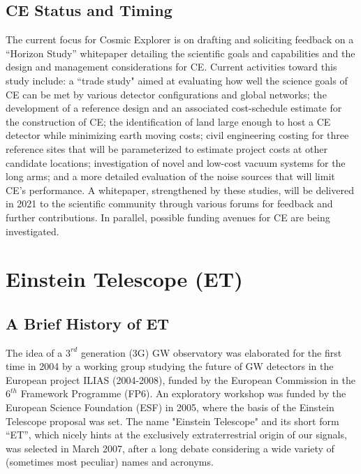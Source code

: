 \documentclass[graybox, nosecnum]{svmult}
\begin{document}
\subsection{CE Status and Timing}

The current focus for Cosmic Explorer is on drafting and soliciting feedback on a ``Horizon Study'' whitepaper detailing the scientific goals and capabilities and the design and management considerations for CE. Current activities toward this study include: a ``trade study" aimed at evaluating how well the science goals of CE can be met by various detector configurations and global networks; the development of a reference design and an associated cost-schedule estimate for the construction of CE; the identification of land large enough to host a CE detector while minimizing earth moving costs; civil engineering costing for three reference sites that will be parameterized to estimate project costs at other candidate locations; investigation of novel and low-cost vacuum systems for the long arms; and a more detailed evaluation of the noise sources that will limit CE's performance. A whitepaper, strengthened by these studies, will be delivered in 2021 to the scientific community through various forums for feedback and further contributions. In parallel, possible funding avenues for CE are being investigated. 

\section{Einstein Telescope (ET)}
\subsection{A Brief History of ET}
The idea of a $3^{rd}$ generation (3G) GW observatory was elaborated for the first time in 2004 by a working group studying the future of GW detectors in the European project ILIAS (2004-2008), funded by the European Commission in the $6^{th}$ Framework Programme (FP6). An exploratory workshop was funded by the European Science Foundation (ESF) in 2005, where the basis of the Einstein Telescope proposal was set. The name "Einstein Telescope" and its short form ``ET'', which nicely hints at the exclusively extraterrestrial origin of our signals, was selected in March 2007, after a long debate considering a wide variety of (sometimes most peculiar) names and acronyms. 
\end{document}
